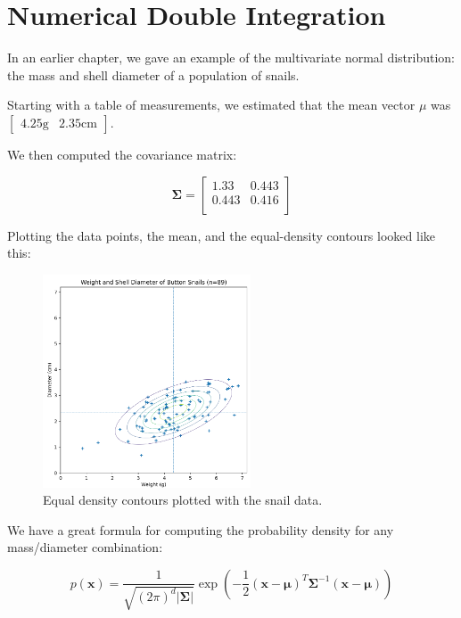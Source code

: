 \chapter{Numerical Double Integration}

In an earlier chapter, we gave an example of the multivariate normal distribution: the mass and shell diameter of a population of snails.

Starting with a table of measurements, we estimated that the mean vector $\mu$ was $\begin{bmatrix}4.25 \text{g} & 2.35 \text{cm}\end{bmatrix}$.

We then computed the covariance matrix:

\begin{equation*}
\mathbf{\Sigma} = \begin{bmatrix}
1.33 &  0.443 \\
0.443 & 0.416 \\
\end{bmatrix}
\end{equation*}

Plotting the data points, the mean, and the equal-density contours looked like this:
\begin{figure}[htbp]
    \centering
    \includegraphics[width=0.55\textwidth]{contour.png}
    \caption{Equal density contours plotted with the snail data.}
    \label{fig:contour}
\end{figure}

We have a great formula for computing the probability density for any mass/diameter combination:

\begin{equation*}
p(\mathbf{x}) = \frac{1}{\sqrt{(2\pi)^d|\mathbf{\Sigma}|}}\exp\left(-\frac{1}{2}(\mathbf{x}-\boldsymbol\mu)^T\mathbf{\Sigma}^{-1}(\mathbf{x}-\boldsymbol\mu)\right)
\end{equation*}

